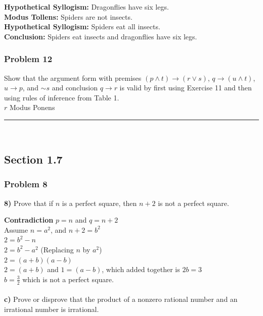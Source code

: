 \documentclass[paper=a4, fontsize=11pt]{scrartcl} %
\newcommand*{\oldneg}{\mathord{\sim}}
\newcommand{\horrule}[1]{\rule{\linewidth}{#1}} %
\begin{document}
\textbf{Hypothetical Syllogism:} Dragonflies have six legs.\\
\textbf{Modus Tollens:} Spiders are not insects.\\
\textbf{Hypothetical Syllogism:} Spiders eat all insects.\\

\textbf{Conclusion:} Spiders eat insects and dragonflies have six legs.

\subsubsection*{Problem 12}
Show that the argument form with premises 
$(p \land t) \to (r \lor s)$, $q \to (u \land t)$, $u \to p$, and $\oldneg s$ and conclusion
$q \to r$ is valid by first using Exercise 11 and then using rules of inference from Table 1.\\

$r$ Modus Ponens


\horrule{0.5pt} \\ %
\subsection*{Section 1.7}
\subsubsection*{Problem 8}
\textbf{8)} Prove that if $n$ is a perfect square, then $n + 2$ is not a
perfect square.

\textbf{Contradiction}
$p = n$ and $q = n+2$\\
Assume $n = a^2$, and $n+2 = b^2$\\
$2 = b^2 - n$\\
$2 = b^2 - a^2$ (Replacing $n$ by $a^2$)\\
$2 = (a+b)(a-b)$\\
$2 = (a+b)$ and $1=(a-b)$, which added together is $2b = 3$\\
$b = \frac{3}{2}$ which is not a perfect square.\\
\\
\textbf{c)} Prove or disprove that the product of a nonzero rational
number and an irrational number is irrational.\\
\end{document}
